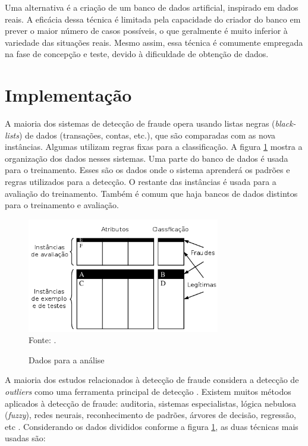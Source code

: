 Uma alternativa é a criação de um banco de dados artificial, inspirado em dados reais. A eficácia dessa técnica é limitada pela capacidade do criador do banco em prever o maior número de casos possíveis, o que geralmente é muito inferior à variedade das situações reais. Mesmo assim, essa técnica é comumente empregada na fase de concepção e teste, devido à dificuldade de obtenção de dados.

\section{Implementação}

A maioria dos sistemas de detecção de fraude opera usando listas negras (\emph{black-lists}) de dados (transações, contas, etc.), que são comparadas com as nova instâncias. Algumas utilizam regras fixas para a classificação. A figura \ref{fig:fraud_data} mostra a organização dos dados nesses sistemas. Uma parte do banco de dados é usada para o treinamento. Esses são os dados onde o sistema aprenderá os padrões e regras utilizados para a detecção. O restante das instâncias é usada para a avaliação do treinamento. Também é comum que haja bancos de dados distintos para o treinamento e avaliação.

\begin{figure}[h!]
    \vspace{0.5cm}
    \centering
    \caption{Dados para a análise}
    \label{fig:fraud_data}
    \vspace{0.5cm}
    \includegraphics[width=0.75\textwidth]{img/fraud-data.png}
    \vspace{0.5cm}
    \\ Fonte: \cite{Phua2010}.
    \vspace{0.5cm}
\end{figure}

A maioria dos estudos relacionados à detecção de fraude considera a detecção de \emph{outliers} como uma ferramenta principal de detecção \cite{Aral2011}. Existem muitos métodos aplicados à detecção de fraude: auditoria, sistemas especialistas, lógica nebulosa (\emph{fuzzy}), redes neurais, reconhecimento de padrões, árvores de decisão, regressão, etc \cite{Huang2010}. Considerando os dados divididos conforme a figura \ref{fig:fraud_data}, as duas técnicas mais usadas são:

